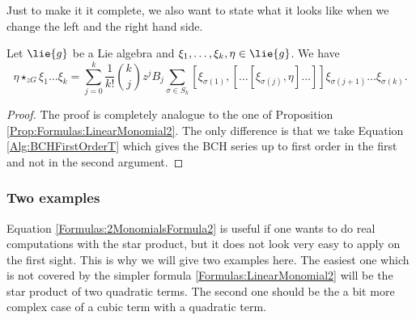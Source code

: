 Just to make it it complete, we also want to state what it looks like when we 
change the left and the right hand side.
\begin{proposition}
	\label{Prop:Formulas:LinearMonomial2T}
    Let $\lie{g}$ be a Lie algebra and $\xi_1, \ldots, \xi_k, \eta \in 
    \lie{g}$. We have
    \begin{equation}\label{Formulas:LinearMonomial2T}
    	\eta \star_{zG} \xi_1 \ldots \xi_k
    	=
    	\sum\limits_{j=0}^k
    	\frac{1}{k!} \binom{k}{j}
    	z^j B_j
    	\sum\limits_{\sigma \in S_k}
    	[\xi_{\sigma(1)}, 
    		[ \ldots [\xi_{\sigma(j)}, \eta] \ldots ]
    	]
    	\xi_{\sigma(j+1)} \ldots \xi_{\sigma(k)}.
    \end{equation}
\end{proposition}
\begin{proof}
	The proof is completely analogue to the one of Proposition 
	\ref{Prop:Formulas:LinearMonomial2}. The only difference is that we take 
	Equation \eqref{Alg:BCHFirstOrderT} which gives the BCH series up to 
	first order in the first and not in the second argument.
\end{proof}



\subsubsection*{Two examples}
Equation \eqref{Formulas:2MonomialsFormula2} is useful if one wants to do 
real computations with the star product, but it does not look very easy to 
apply on the first sight. This is why we will give two examples here. The 
easiest one which is not covered by the simpler formula 
\eqref{Formulas:LinearMonomial2} will be the star product of two quadratic 
terms. The second one should be the a bit more complex case of a cubic term 
with a quadratic term.

